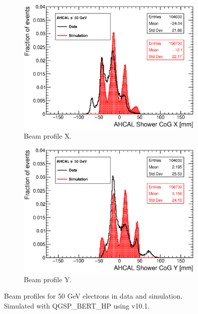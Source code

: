 \begin{figure}[htbp!]
  \centering
  \begin{subfigure}[t]{0.49\textwidth}
    \includegraphics[width=1.\linewidth]{../Thesis_Plots/Validation/Plots/Run24405_CoGX_AHCAL_50GeV_Comparison.eps}
    \caption{Beam profile X.} \label{fig:e50GeVX}
  \end{subfigure}
  \hfill
  \begin{subfigure}[t]{0.49\textwidth}
    \includegraphics[width=1.\linewidth]{../Thesis_Plots/Validation/Plots/Run24405_CoGY_AHCAL_50GeV_Comparison.eps}
    \caption{Beam profile Y.} \label{fig:e50GeVY}
  \end{subfigure}
  \caption{Beam profiles for 50 GeV electrons in data and simulation. Simulated with QGSP\_BERT\_HP using \geant v10.1.}
\end{figure}

